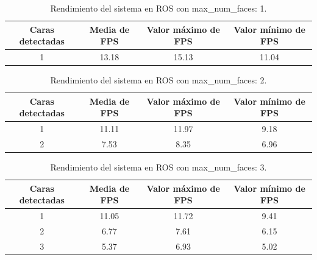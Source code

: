\begin{table}[H]
\begin{center}
\begin{adjustbox}{max width=\textwidth}
\begin{tabular}{|c|c|c|c|}
     \hline
    \textbf{Caras detectadas} & \textbf{Media de FPS} & \textbf{Valor máximo de FPS} & \textbf{Valor mínimo de FPS}\\
    \hline
     1 & 13.18 & 15.13 & 11.04\\
     \hline
 \end{tabular}
 \end{adjustbox}
 \captionsetup{justification=centering}
\caption{Rendimiento del sistema en ROS con max\_num\_faces: 1.}
\label{cuadro:rendimiento_ros_1}
\end{center}
\end{table}

\begin{table}[H]
\begin{center}
\begin{adjustbox}{max width=\textwidth}
\begin{tabular}{|c|c|c|c|}
     \hline
    \textbf{Caras detectadas} & \textbf{Media de FPS} & \textbf{Valor máximo de FPS} & \textbf{Valor mínimo de FPS}\\
    \hline
     1 & 11.11 & 11.97 & 9.18\\
     2 & 7.53 & 8.35 & 6.96\\
     \hline
 \end{tabular}
 \end{adjustbox}
 \captionsetup{justification=centering}
\caption{Rendimiento del sistema en ROS con max\_num\_faces: 2.}
\label{cuadro:rendimiento_ros_2}
\end{center}
\end{table}

\begin{table}[H]
\begin{center}
\begin{adjustbox}{max width=\textwidth}
\begin{tabular}{|c|c|c|c|}
     \hline
    \textbf{Caras detectadas} & \textbf{Media de FPS} & \textbf{Valor máximo de FPS} & \textbf{Valor mínimo de FPS}\\
    \hline
     1 & 11.05 & 11.72 & 9.41\\
     2 & 6.77 & 7.61 & 6.15\\
     3 & 5.37 & 6.93 & 5.02\\
     \hline
 \end{tabular}
 \end{adjustbox}
 \captionsetup{justification=centering}
\caption{Rendimiento del sistema en ROS con max\_num\_faces: 3.}
\label{cuadro:rendimiento_ros_3}
\end{center}
\end{table}